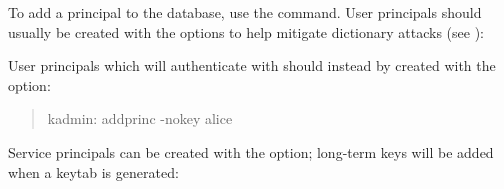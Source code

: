 \documentclass[letterpaper,10pt,english]{sphinxmanual}
\begin{document}
To add a principal to the database, use the {\hyperref[\detokenize{admin/admin_commands/kadmin_local:kadmin-1}]{}}
 command.  User principals should usually be created
with the  options to help mitigate
dictionary attacks (see {\hyperref[\detokenize{admin/dictionary:dictionary}]{}}):

%
\begin{sphinxVerbatim}[commandchars=\\\{\}]
    
    
    
\end{sphinxVerbatim}

User principals which will authenticate with {\hyperref[\detokenize{admin/pkinit:pkinit}]{}} should
instead by created with the  option:
\begin{quote}

kadmin: addprinc -nokey alice
\end{quote}

Service principals can be created with the  option;
long-term keys will be added when a keytab is generated:
\end{document}
